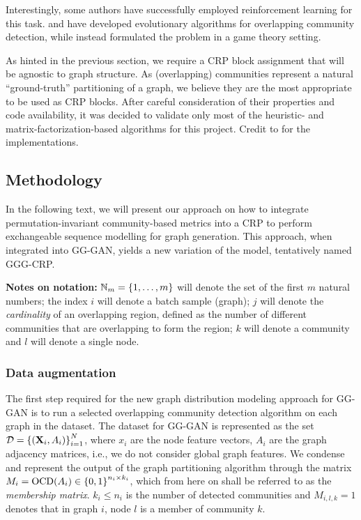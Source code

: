 Interestingly, some authors have successfully employed reinforcement learning for this task. \cite{zhang_mixed_2017} and \cite{bello-orgaz_multi-objective_2018} have developed evolutionary algorithms for overlapping community detection, while \cite{wang_effective_2021} instead formulated the problem in a game theory setting. 

As hinted in the previous section, we require a CRP block assignment that will be agnostic to graph structure. As (overlapping) communities represent a natural \enquote{ground-truth} partitioning of a graph, we believe they are the most appropriate to be used as CRP blocks. After careful consideration of their properties and code availability, it was decided to validate only most of the heuristic- and matrix-factorization-based algorithms for this project. Credit to \cite{csardi_igraph_2006, rozemberczki_karate_2020, li_local_2018, janchevski_dnmf-python_2022} for the implementations.

\subsection{Methodology}
\label{sec:methodology_gggcrp}

In the following text, we will present our approach on how to integrate permutation-invariant community-based metrics into a CRP to perform exchangeable sequence modelling for graph generation. This approach, when integrated into GG-GAN, yields a new variation of the model, tentatively named GGG-CRP. 

\textbf{Notes on notation:} $\mathbb{N}_{m} = \mathopen{}\left\{1,\dots,m\right\}$ will denote the set of the first $m$ natural numbers; the index $i$ will denote a batch sample (graph); $j$ will denote the \emph{cardinality} of an overlapping region, defined as the number of different communities that are overlapping to form the region; $k$ will denote a community and $l$ will denote a single node.

\subsubsection{Data augmentation}
The first step required for the new graph distribution modeling approach for GG-GAN is to run a selected overlapping community detection algorithm on each graph in the dataset. The dataset for GG-GAN is represented as the set $\mathcal{D} = \mathopen{}\left\{\mathopen{}\left(\mathbf{X}_i, A_i\right)\right\}_{i=1}^{N}$, where $x_i$ are the node feature vectors, $A_i$ are the graph adjacency matrices, i.e., we do not consider global graph features. We condense and represent the output of the graph partitioning algorithm through the matrix $M_i = \text{OCD}\mathopen{}\left(A_i\right) \in \mathopen{}\left\{0, 1\right\}^{n_i \times k_i}$, which from here on shall be referred to as the \emph{membership matrix}. $k_i \leq n_i$ is the number of detected communities and $M_{i,l,k}=1$ denotes that in graph $i$, node $l$ is a member of community $k$.

